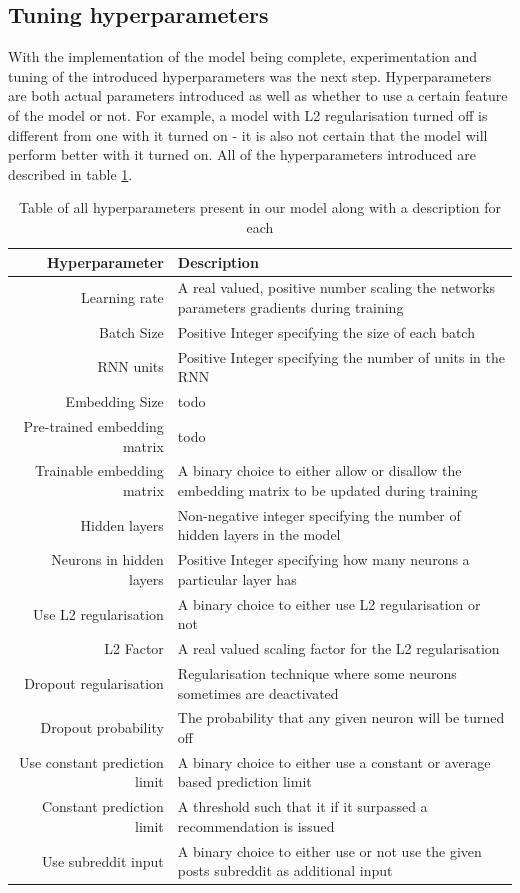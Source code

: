 \subsection{Tuning hyperparameters}
With the implementation of the model being complete, experimentation and tuning of the introduced hyperparameters was the next step. Hyperparameters are both actual parameters introduced as well as whether to use a certain feature of the model or not. For example, a model with L2 regularisation turned off is different from one with it turned on - it is also not certain that the model will perform better with it turned on. All of the hyperparameters introduced are described in table \ref{table:hyperparameters}.
\begin{table}[h!]
    \centering
    \begin{tabular}{ r  p{7cm} }
        \hline
        \textbf{Hyperparameter}  &  \textbf{Description} \\ \hline \hline
        Learning rate & A real valued, positive number scaling the networks parameters gradients during training  \\ \hline
        Batch Size & Positive Integer specifying the size of each batch \\ \hline
        RNN units & Positive Integer specifying the number of units in the RNN  \\ \hline
        Embedding Size & todo \\ \hline
        Pre-trained embedding matrix & todo \\ \hline
        Trainable embedding matrix & A binary choice to either allow or disallow the embedding matrix to be updated during training \\ \hline
        Hidden layers & Non-negative integer specifying the number of hidden layers in the model \\ \hline
        Neurons in hidden layers & Positive Integer specifying how many neurons a particular layer has \\ \hline
        Use L2 regularisation & A binary choice to either use L2 regularisation or not \\ \hline
        L2 Factor & A real valued scaling factor for the L2 regularisation \\ \hline
        Dropout regularisation& Regularisation technique where some neurons sometimes are deactivated \\ \hline
        Dropout probability & The probability that any given neuron will be turned off \\ \hline
        Use constant prediction limit & A binary choice to either use a constant or average based prediction limit \\ \hline
        Constant prediction limit & A threshold such that it if it surpassed a recommendation is issued  \\ \hline
        Use subreddit input & A binary choice to either use or not use the given posts subreddit as additional input \\ \hline
    \end{tabular}
    \caption{Table of all hyperparameters present in our model along with a description for each}
    \label{table:hyperparameters}
\end{table}
